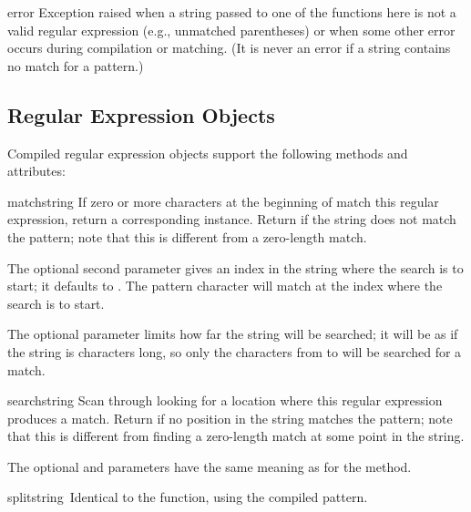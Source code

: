 \begin{excdesc}{error}
  Exception raised when a string passed to one of the functions here
  is not a valid regular expression (e.g., unmatched parentheses) or
  when some other error occurs during compilation or matching.  (It is
  never an error if a string contains no match for a pattern.)
\end{excdesc}

\subsection{Regular Expression Objects}
Compiled regular expression objects support the following methods and
attributes:

\renewcommand{\indexsubitem}{(re method)}
\begin{funcdesc}{match}{string}
  If zero or more characters at the beginning of  match
  this regular expression, return a corresponding
   instance.  Return  if the string does not
  match the pattern; note that this is different from a zero-length
  match.
  
  The optional second parameter  gives an index in the string
  where the search is to start; it defaults to .  The
   pattern character will match at the index where the
  search is to start.

  The optional parameter  limits how far the string will
  be searched; it will be as if the string is  characters
  long, so only the characters from  to  will be
  searched for a match.
\end{funcdesc}

\begin{funcdesc}{search}{string}
  Scan through  looking for a location where this regular
  expression produces a match.  Return  if no
  position in the string matches the pattern; note that this is
  different from finding a zero-length match at some point in the string.
  
  The optional  and  parameters have the same
  meaning as for the  method.
\end{funcdesc}

\begin{funcdesc}{split}{string\, }
Identical to the  function, using the compiled pattern.
\end{funcdesc}

